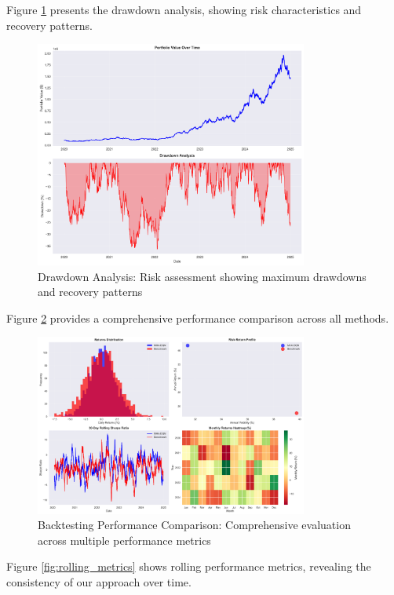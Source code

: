 \documentclass[11pt]{article}
\begin{document}
Figure \ref{fig:drawdown_analysis} presents the drawdown analysis, showing risk characteristics and recovery patterns.

\begin{figure}[H]
\centering
\includegraphics[width=0.8\textwidth]{figures/backtesting_drawdown_analysis.png}
\caption{Drawdown Analysis: Risk assessment showing maximum drawdowns and recovery patterns}
\label{fig:drawdown_analysis}
\end{figure}

Figure \ref{fig:backtesting_performance} provides a comprehensive performance comparison across all methods.

\begin{figure}[H]
\centering
\includegraphics[width=0.8\textwidth]{figures/backtesting_performance_comparison.png}
\caption{Backtesting Performance Comparison: Comprehensive evaluation across multiple performance metrics}
\label{fig:backtesting_performance}
\end{figure}

Figure \ref{fig:rolling_metrics} shows rolling performance metrics, revealing the consistency of our approach over time.
\end{document}
